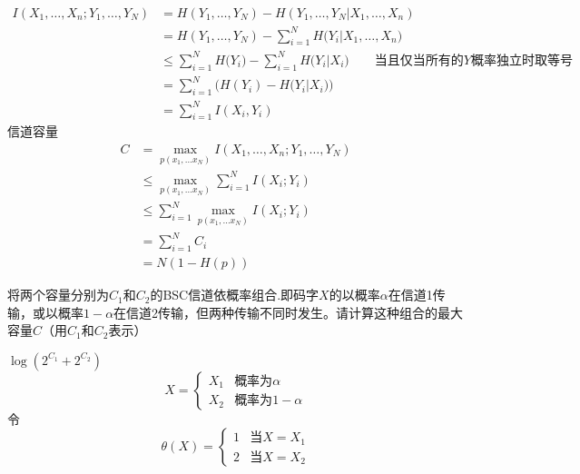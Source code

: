 \documentclass[a4paper]{exam}
\begin{document}
\begin{CJK*}{UTF8}{gbsn}
\begin{questions}
\begin{solution}
\begin{equation*}
\begin{split}
    I({X_1}, \ldots ,{X_n};{Y_1}, \ldots ,{Y_N}) &= H({Y_1}, \ldots ,{Y_N}) - H({Y_1}, \ldots ,{Y_N}|{X_1}, \ldots ,{X_n})\\
    & = H({Y_1}, \ldots ,{Y_N}) - \sum\limits_{i = 1}^N {H({Y_i}|} {X_1}, \ldots ,{X_n})\\
    &  \le \sum\limits_{i = 1}^N {H({Y_i}} ) - \sum\limits_{i = 1}^N {H({Y_i}|} {X_i})\qquad \text{当且仅当所有的$Y$概率独立时取等号}\\
    & = \sum\limits_{i = 1}^N {(H({Y_i}) - H({Y_i}|} {X_i}))\\
    & = \sum\limits_{i = 1}^N {I({X_i},{Y_i})} 
    \end{split}
    \end{equation*}
    信道容量
    \begin{equation*}
        \begin{split}
        C &= \mathop {\max }\limits_{p({x_1}, \ldots {x_N})} I({X_1}, \ldots ,{X_n};{Y_1}, \ldots ,{Y_N})\\
        & \le \mathop {\max }\limits_{p({x_1}, \ldots {x_N})} \sum\limits_{i = 1}^N {I({X_i};{Y_i})} \\
        & \le \sum\limits_{i = 1}^N {\mathop {\max }\limits_{p({x_1}, \ldots {x_N})} I({X_i};{Y_i})} \\
        & = \sum\limits_{i = 1}^N {{C_i}}\\
        & = N(1 - H(p))
        \end{split}
    \end{equation*}
    \end{solution}
    \vspace{1.5cm}
    \question 将两个容量分别为$C_1$和$C_2$的BSC信道依概率组合.即码字$X$的以概率$\alpha$在信道1传输，或以概率$1-\alpha$在信道2传输，但两种传输不同时发生。请计算这种组合的最大容量$C$（用$C_1$和$C_2$表示）
    \begin{solution}
    $\log ({2^{{C_1}}} + {2^{{C_2}}})$
\begin{equation*}
    X=
   \begin{cases}
   {{X_1}} &\mbox{概率为}\alpha\\
   {{X_2}} &\mbox{概率为}1-\alpha
   \end{cases}
  \end{equation*}
  令
  \begin{equation*}
    \theta (X)=
   \begin{cases}
   1 &\mbox{当}X=X_1\\
   2 &\mbox{当}X=X_2
   \end{cases}
  \end{equation*}

\end{solution}
\end{questions}
\end{CJK*}
\end{document}
